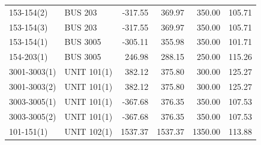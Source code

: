 \documentclass[10pt]{report}
\begin{document}
\begin{table}[H]
{\begin{tabular}{llrrrr}
153-154(2) & BUS 203 & -317.55 & 369.97 & 350.00 & 105.71 \\
153-154(3) & BUS 203 & -317.55 & 369.97 & 350.00 & 105.71 \\
153-154(1) & BUS 3005 & -305.11 & 355.98 & 350.00 & 101.71 \\
154-203(1) & BUS 3005 & 246.98 & 288.15 & 250.00 & 115.26 \\
3001-3003(1) & UNIT 101(1) & 382.12 & 375.80 & 300.00 & 125.27 \\
3001-3003(2) & UNIT 101(1) & 382.12 & 375.80 & 300.00 & 125.27 \\
3003-3005(1) & UNIT 101(1) & -367.68 & 376.35 & 350.00 & 107.53 \\
3003-3005(2) & UNIT 101(1) & -367.68 & 376.35 & 350.00 & 107.53 \\
101-151(1) & UNIT 102(1) & 1537.37 & 1537.37 & 1350.00 & 113.88 \\
\bottomrule
\end{tabular}}
\end{table}
\end{document}
